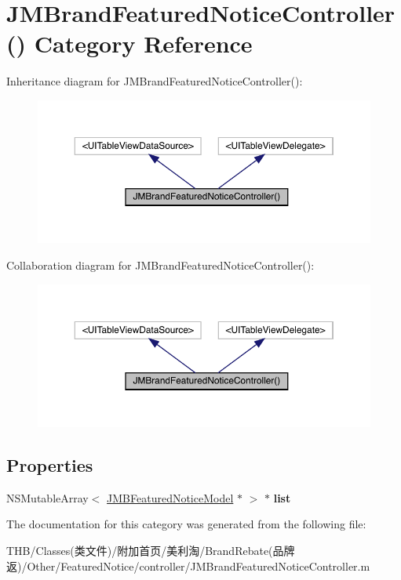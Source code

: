 \hypertarget{category_j_m_brand_featured_notice_controller_07_08}{}\section{J\+M\+Brand\+Featured\+Notice\+Controller() Category Reference}
\label{category_j_m_brand_featured_notice_controller_07_08}


Inheritance diagram for J\+M\+Brand\+Featured\+Notice\+Controller()\+:\nopagebreak
\begin{figure}[H]
\begin{center}
\leavevmode
\includegraphics[width=350pt]{category_j_m_brand_featured_notice_controller_07_08__inherit__graph}
\end{center}
\end{figure}


Collaboration diagram for J\+M\+Brand\+Featured\+Notice\+Controller()\+:\nopagebreak
\begin{figure}[H]
\begin{center}
\leavevmode
\includegraphics[width=350pt]{category_j_m_brand_featured_notice_controller_07_08__coll__graph}
\end{center}
\end{figure}
\subsection*{Properties}
\begin{DoxyCompactItemize}
\item 
\mbox{\label{category_j_m_brand_featured_notice_controller_07_08_a6daa69965c5bad44570146c3b4205ea9}} 
N\+S\+Mutable\+Array$<$ \mbox{\hyperlink{interface_j_m_b_featured_notice_model}{J\+M\+B\+Featured\+Notice\+Model}} $\ast$ $>$ $\ast$ {\bfseries list}
\end{DoxyCompactItemize}


The documentation for this category was generated from the following file\+:\begin{DoxyCompactItemize}
\item 
T\+H\+B/\+Classes(类文件)/附加首页/美利淘/\+Brand\+Rebate(品牌返)/\+Other/\+Featured\+Notice/controller/J\+M\+Brand\+Featured\+Notice\+Controller.\+m\end{DoxyCompactItemize}
